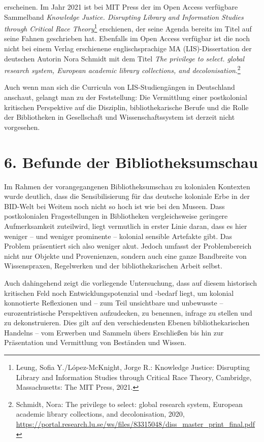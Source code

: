 \documentclass[a4paper,
fontsize=11pt,
oneside,
numbers=noperiodatend,
parskip=half-,
bibliography=totoc,
final
]{scrartcl}
\begin{document}
erscheinen. Im Jahr 2021 ist bei MIT Press der im Open Access verfügbare
Sammelband \emph{Knowledge Justice. Disrupting Library and Information
Studies through Critical Race Theory}\footnote{Leung, Sofia
  Y./López-McKnight, Jorge R.: Knowledge Justice: Disrupting Library and
  Information Studies through Critical Race Theory, Cambridge,
  Massachusetts: The MIT Press, 2021.} erschienen, der seine Agenda
bereits im Titel auf seine Fahnen geschrieben hat. Ebenfalls im Open
Access verfügbar ist die noch nicht bei einem Verlag erschienene
englischsprachige MA (LIS)-Dissertation der deutschen Autorin Nora
Schmidt mit dem Titel \emph{The privilege to select. global research
system, European academic library collections, and
decolonisation}.\footnote{Schmidt, Nora: The privilege to select: global
  research system, European academic library collections, and
  decolonisation, 2020,
  \url{https://portal.research.lu.se/ws/files/83315048/diss_master_print_final.pdf}}

Auch wenn man sich die Curricula von LIS-Studiengängen in Deutschland
anschaut, gelangt man zu der Feststellung: Die Vermittlung einer
postkolonial kritischen Perspektive auf die Disziplin, bibliothekarische
Berufe und die Rolle der Bibliotheken in Gesellschaft und
Wissenschaftssystem ist derzeit nicht vorgesehen.

\hypertarget{befunde-der-bibliotheksumschau}{%
\section{6. Befunde der
Bibliotheksumschau}\label{befunde-der-bibliotheksumschau}}

Im Rahmen der vorangegangenen Bibliotheksumschau zu kolonialen Kontexten
wurde deutlich, dass die Sensibilisierung für das deutsche koloniale
Erbe in der BID-Welt bei Weitem noch nicht so hoch ist wie bei den
Museen. Dass postkolonialen Fragestellungen in Bibliotheken
vergleichsweise geringere Aufmerksamkeit zuteilwird, liegt vermutlich in
erster Linie daran, dass es hier weniger -- und weniger prominente --
kolonial sensible Artefakte gibt. Das Problem präsentiert sich also
weniger akut. Jedoch umfasst der Problembereich nicht nur Objekte und
Provenienzen, sondern auch eine ganze Bandbreite von Wissenspraxen,
Regelwerken und der bibliothekarischen Arbeit selbst.

Auch dahingehend zeigt die vorliegende Untersuchung, dass auf diesem
historisch kritischen Feld noch Entwicklungspotenzial und -bedarf liegt,
um kolonial konnotierte Reflexionen und -- zum Teil unsichtbare und
unbewusste -- eurozentristische Perspektiven aufzudecken, zu benennen,
infrage zu stellen und zu dekonstruieren. Dies gilt auf den
verschiedensten Ebenen bibliothekarischen Handelns -- vom Erwerben und
Sammeln übers Erschließen bis hin zur Präsentation und Vermittlung von
Beständen und Wissen.
\end{document}
